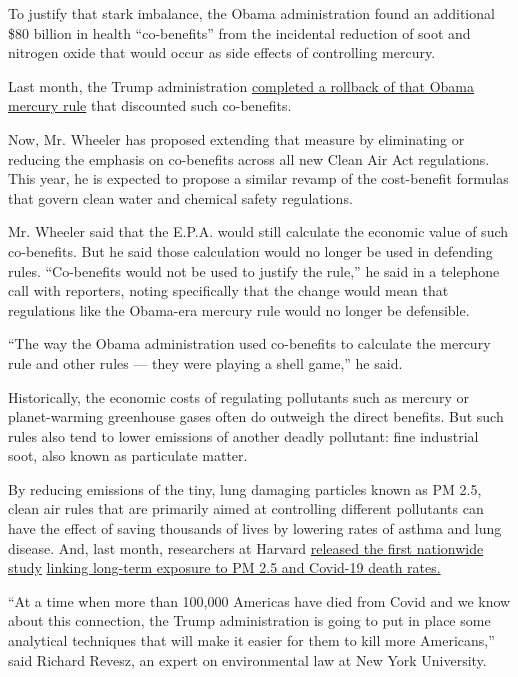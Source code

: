 To justify that stark imbalance, the Obama administration found an
additional \$80 billion in health ``co-benefits'' from the incidental
reduction of soot and nitrogen oxide that would occur as side effects of
controlling mercury.

Last month, the Trump administration
\href{https://www.nytimes3xbfgragh.onion/2020/04/16/climate/epa-mercury-coal.html}{completed
a rollback of that Obama mercury rule} that discounted such co-benefits.

Now, Mr. Wheeler has proposed extending that measure by eliminating or
reducing the emphasis on co-benefits across all new Clean Air Act
regulations. This year, he is expected to propose a similar revamp of
the cost-benefit formulas that govern clean water and chemical safety
regulations.

Mr. Wheeler said that the E.P.A. would still calculate the economic
value of such co-benefits. But he said those calculation would no longer
be used in defending rules. ``Co-benefits would not be used to justify
the rule,'' he said in a telephone call with reporters, noting
specifically that the change would mean that regulations like the
Obama-era mercury rule would no longer be defensible.

``The way the Obama administration used co-benefits to calculate the
mercury rule and other rules --- they were playing a shell game,'' he
said.

Historically, the economic costs of regulating pollutants such as
mercury or planet-warming greenhouse gases often do outweigh the direct
benefits. But such rules also tend to lower emissions of another deadly
pollutant: fine industrial soot, also known as particulate matter.

By reducing emissions of the tiny, lung damaging particles known as PM
2.5, clean air rules that are primarily aimed at controlling different
pollutants can have the effect of saving thousands of lives by lowering
rates of asthma and lung disease. And, last month, researchers at
Harvard \href{https://projects.iq.harvard.edu/covid-pm}{released the
first nationwide study}
\href{https://www.nytimes3xbfgragh.onion/2020/04/07/climate/air-pollution-coronavirus-covid.html}{linking
long-term exposure to PM 2.5 and Covid-19 death rates.}

``At a time when more than 100,000 Americas have died from Covid and we
know about this connection, the Trump administration is going to put in
place some analytical techniques that will make it easier for them to
kill more Americans,'' said Richard Revesz, an expert on environmental
law at New York University.

